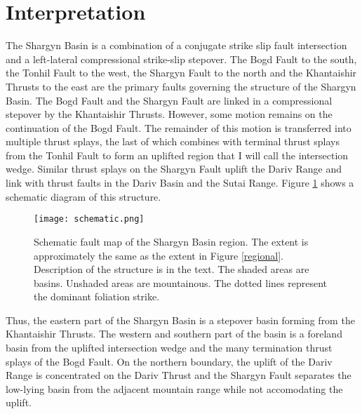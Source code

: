\section{Interpretation}
	The Shargyn Basin is a combination of a conjugate strike slip fault intersection and a left-lateral compressional strike-slip stepover. The Bogd Fault to the south, the Tonhil Fault to the west, the Shargyn Fault to the north and the Khantaishir Thrusts to the east are the primary faults governing the structure of the Shargyn Basin. The Bogd Fault and the Shargyn Fault are linked in a compressional stepover by the Khantaishir Thrusts. However, some motion remains on the continuation of the Bogd Fault. The remainder of this motion is transferred into multiple thrust splays, the last of which combines with terminal thrust splays from the Tonhil Fault to form an uplifted region that I will call the intersection wedge. Similar thrust splays on the Shargyn Fault uplift the Dariv Range and link with thrust faults in the Dariv Basin and the Sutai Range. Figure \ref{schematic} shows a schematic diagram of this structure.

\begin{figure}[h!]
  \centering
  \texttt{[image: schematic.png]}
  \caption{Schematic fault map of the Shargyn Basin region. The extent is approximately the same as the extent in Figure \ref{regional}. Description of the structure is in the text. The shaded areas are basins. Unshaded areas are mountainous. The dotted lines represent the dominant foliation strike. }
  \label{schematic}
\end{figure}

	Thus, the eastern part of the Shargyn Basin is a stepover basin forming from the Khantaishir Thrusts. The western and southern part of the basin is a foreland basin from the uplifted intersection wedge and the many termination thrust splays of the Bogd Fault. On the northern boundary, the uplift of the Dariv Range is concentrated on the Dariv Thrust and the Shargyn Fault separates the low-lying basin from the adjacent mountain range while not accomodating the uplift.
	

